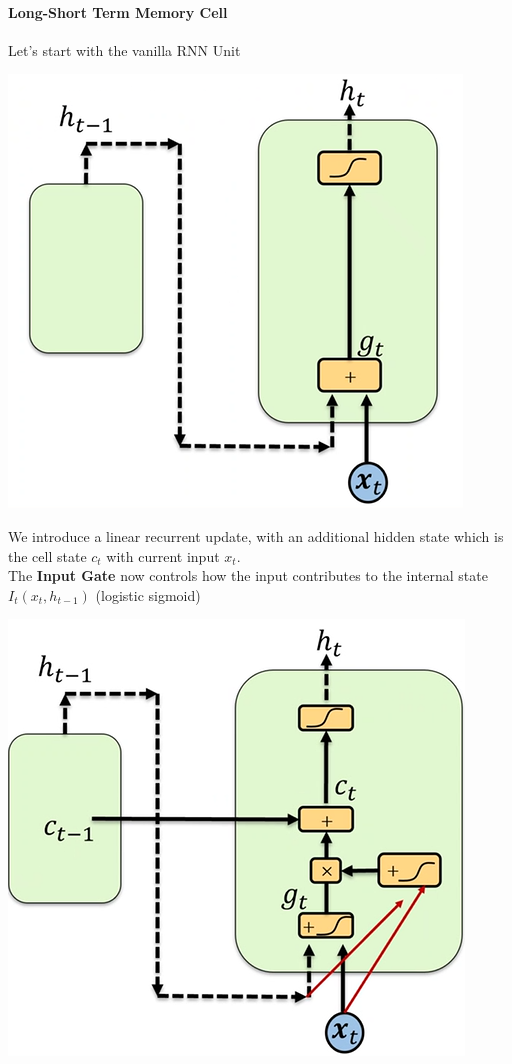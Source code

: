 \documentclass[10pt]{report}
\begin{document}
\paragraph{Long-Short Term Memory Cell} Let's start with the vanilla RNN Unit
\begin{center}
	\includegraphics[scale=0.33]{94.png}
\end{center}
We introduce a linear recurrent update, with an additional hidden state which is the cell state $c_t$ with current input $x_t$.\\
The \textbf{Input Gate} now controls how the input contributes to the internal state $I_t(x_t, h_{t-1})$ (logistic sigmoid)
\begin{center}
	\includegraphics[scale=0.33]{95.png}
\end{center}
\end{document}
